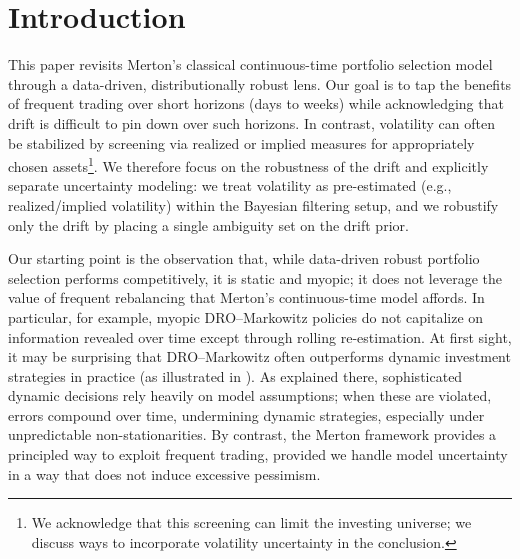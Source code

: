 \documentclass[11pt]{article}
\theoremstyle{definition}
\begin{document}
\section{Introduction}\label{intro}

This paper revisits Merton’s classical continuous-time portfolio selection model through a data-driven,
distributionally robust lens. Our goal is to tap the benefits of frequent trading over short horizons (days to weeks) while acknowledging that drift is difficult to pin down over such horizons. In contrast, volatility can often be stabilized by screening via realized or implied measures for appropriately chosen assets\footnote{We acknowledge that this screening can limit the investing universe; we discuss ways to incorporate volatility uncertainty in the conclusion.}. We therefore focus on the robustness of the drift and explicitly separate uncertainty modeling: we treat volatility as pre-estimated (e.g., realized/implied volatility) within the Bayesian filtering setup, and we robustify only the drift by placing a single ambiguity set on the drift prior.

Our starting point is the observation that, while data-driven robust portfolio selection performs competitively, it is static and myopic; it does not leverage the value of frequent rebalancing that Merton's continuous-time model affords. In particular, for example, myopic DRO--Markowitz policies do not capitalize on information revealed over time except through rolling re-estimation. At first sight, it may be surprising that DRO--Markowitz often outperforms dynamic investment strategies in practice (as illustrated in \citep{BlanchetChenZhou2021}). As explained there, sophisticated dynamic decisions rely heavily on model assumptions; when these are violated, errors compound over time, undermining dynamic strategies, especially under unpredictable non-stationarities. By contrast, the Merton framework provides a principled way to exploit frequent trading, provided we handle model uncertainty in a way that does not induce excessive pessimism.
\end{document}
